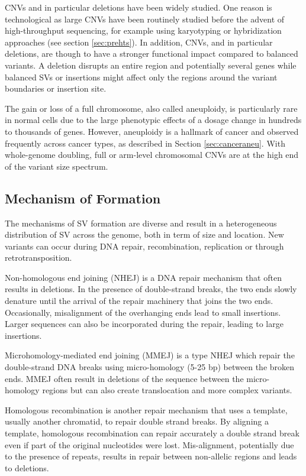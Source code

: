 CNVs and in particular deletions have been widely studied.
One reason is technological as large CNVs have been routinely studied before the advent of high-throughput sequencing, for example using karyotyping or hybridization approaches (see section \ref{sec:prehts}).
In addition, CNVs, and in particular deletions, are though to have a stronger functional impact compared to balanced variants.
A deletion disrupts an entire region and potentially several genes while balanced SVs or insertions might affect only the regions around the variant boundaries or insertion site.

The gain or loss of a full chromosome, also called aneuploidy, is particularly rare in normal cells due to the large phenotypic effects of a dosage change in hundreds to thousands of genes.
However, aneuploidy is a hallmark of cancer and observed frequently across cancer types, as described in Section \ref{sec:canceraneu}. 
With whole-genome doubling, full or arm-level chromosomal CNVs are at the high end of the variant size spectrum.

\subsection{Mechanism of Formation}
The mechanisms of SV formation are diverse and result in a heterogeneous distribution of SV across the genome, both in term of size and location\cite{Hall2012,Sharp2006,Mills2011}.
New variants can occur during DNA repair, recombination, replication or through retrotransposition.

Non-homologous end joining (NHEJ) is a DNA repair mechanism that often results in deletions.
In the presence of double-strand breaks, the two ends slowly denature until the arrival of the repair machinery that joins the two ends.
Occasionally, misalignment of the overhanging ends lead to small insertions.
Larger sequences can also be incorporated during the repair, leading to large insertions.

Microhomology-mediated end joining (MMEJ) is a type NHEJ which repair the double-strand DNA breaks using micro-homology (5-25 bp) between the broken ends. 
MMEJ often result in deletions of the sequence between the micro-homology regions but can also create translocation and more complex variants.

Homologous recombination is another repair mechanism that uses a template, usually another chromatid, to repair double strand breaks.
By aligning a template, homologous recombination can repair accurately a double strand break even if part of the original nucleotides were lost.
Mis-alignment, potentially due to the presence of repeats, results in repair between non-allelic regions and leads to deletions.

